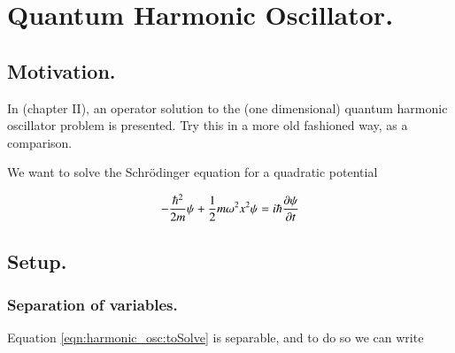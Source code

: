 
%
%




\chapter{Quantum Harmonic Oscillator. }
\date{ April 19, 2009.  Last Revision: $Date: 2009/06/04 12:52:02 $ }

%

\section{Motivation. }

In \cite{byron1992mca} (chapter II), an operator solution to the
(one dimensional) quantum
harmonic oscillator problem is presented.  Try this in a more old fashioned way,
as a comparison.

We want to solve the Schr\"{o}dinger equation for a quadratic potential

\begin{align}\label{eqn:harmonic_osc:toSolve}
-\frac{\hbar^2}{2m} \psi + \frac{1}{2} m \omega^2 x^2 \psi = i \hbar \frac{\partial {\psi}}{\partial {t}}
\end{align}

\section{Setup. }

\subsection{Separation of variables. }

Equation \ref{eqn:harmonic_osc:toSolve} is separable, and to do so we can write


